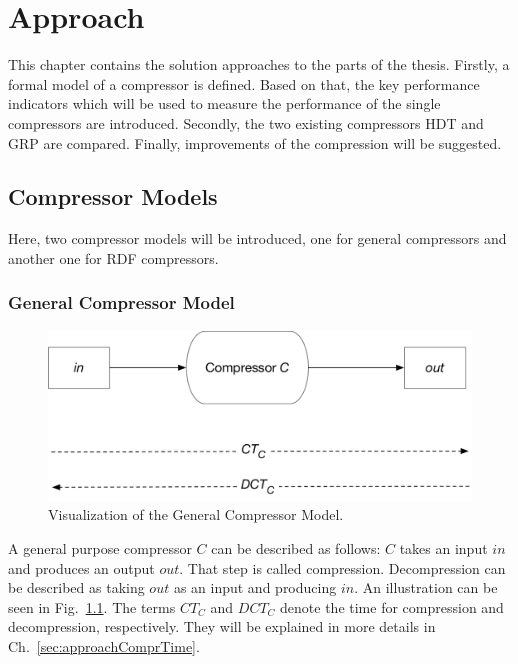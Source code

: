 \chapter{Approach}\label{ch:approach}

This chapter contains the solution approaches to the parts of the thesis. Firstly, a formal model of a compressor is defined. Based on that, the key performance indicators which will be used to measure the performance of the single compressors are introduced. Secondly, the two existing compressors HDT and GRP are compared. Finally, improvements of the compression will be suggested.


\section{Compressor Models}

Here, two compressor models will be introduced, one for general compressors and another one for RDF compressors. 

\subsection{General Compressor Model}\label{sec:generalcompressorModel}

\begin{figure}
	\centering
	\includegraphics[width=0.8\linewidth]{figures/approach/model_general}
	\caption{Visualization of the General Compressor Model.}
	\label{fig:generalcompressorModel}
\end{figure}

A general purpose compressor $C$ can be described as follows: $C$ takes an input $in$ and produces an output $out$. That step is called compression. Decompression can be described as taking $out$ as an input and producing $in$. An illustration can be seen in Fig.~\ref{fig:generalcompressorModel}. The terms $CT_C$ and $DCT_C$ denote the time for compression and decompression, respectively. They will be explained in more details in Ch.~\ref{sec:approachComprTime}.

